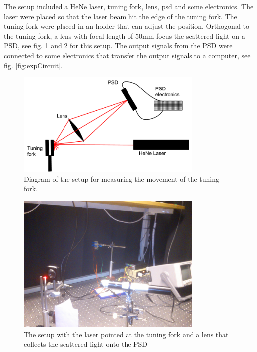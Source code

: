 The setup included a HeNe laser, tuning fork, lens, psd and some electronics. The laser were 
placed so that the laser beam hit the edge of the tuning fork. The tuning fork were placed in 
an holder that can adjust the position. Orthogonal to the tuning fork, a lens with focal length of 
50mm focus the scattered light on a PSD, see fig. \ref{fig:expSetupDiagram} and \ref{fig:expCompleteLive} for this setup.
The output signals from the PSD were connected to some electronics that transfer the output signals to a computer, see fig. \ref{fig:expCircuit}.

\begin{figure}[h!]
	\centering
	\includegraphics[width=0.8\textwidth]{img/expSetupDiagram}
	\caption{Diagram of the setup for measuring the movement of the tuning fork.}
	\label{fig:expSetupDiagram}
\end{figure}

\begin{figure}[h!]
	\centering
	\includegraphics[width=0.8\textwidth]{img/expCompleteLive}
	\caption{The setup with the laser pointed at the tuning fork and a lens that collects the scattered light onto the PSD}
	\label{fig:expCompleteLive}
\end{figure}

